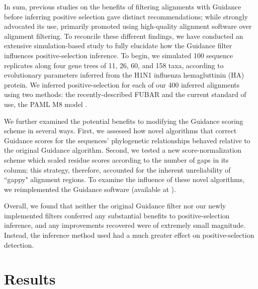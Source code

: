 \documentclass[10pt]{article}
\begin{document}
In sum, previous studies on the benefits of filtering alignments with Guidance before inferring positive selection gave distinct recommendations; while \citet{Privman2012} strongly advocated its use, \citet{Jordan2012} primarily promoted using high-quality alignment software over alignment filtering. To reconcile these different findings, we have conducted an extensive simulation-based study to fully elucidate how the Guidance filter influences positive-selection inference. To begin, we simulated 100 sequence replicates along four gene trees of 11, 26, 60, and 158 taxa, according to evolutionary parameters inferred from the H1N1 influenza hemagluttinin (HA) protein. We inferred positive-selection for each of our 400 inferred alignments using two methods: the recently-described FUBAR \citep{Murrell2013} and the current standard of use, the PAML M8 model \citep{Yang2007}. 

We further examined the potential benefits to modifying the Guidance scoring scheme in several ways. First, we assessed how novel algorithms that correct Guidance scores for the sequences' phylogenetic relationships behaved relative to the original Guidance algorithm. Second, we tested a new score-normalization scheme which scaled residue scores according to the number of gaps in its column; this strategy, therefore, accounted for the inherent unreliability of ``gappy" alignment regions. To examine the influence of these novel algorithms, we reimplemented the Guidance software (available at ).

Overall, we found that neither the original Guidance filter nor our newly implemented filters conferred any substantial benefits to positive-selection inference, and any improvements recovered were of extremely small magnitude. Instead, the inference method used had a much greater effect on positive-selection detection.


\section*{Results}
\end{document}
